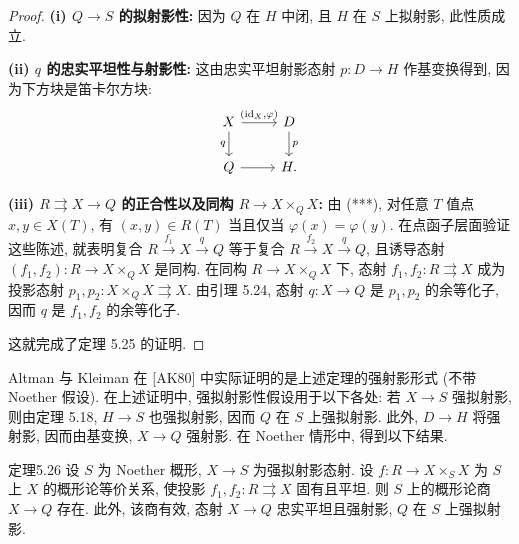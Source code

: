 \begin{proof}
\textbf{(i) $Q\to S$ 的拟射影性:} 因为 $Q$ 在 $H$ 中闭, 且 $H$ 在 $S$ 上拟射影, 此性质成立.

\textbf{(ii) $q$ 的忠实平坦性与射影性:} 这由忠实平坦射影态射 $p:D\to H$ 作基变换得到, 因为下方块是笛卡尔方块:
\[
\begin{tikzcd}
 X\arrow[r,"{(\id_X,\varphi)}"]\arrow[d,"q"']&D\arrow[d,"p"]\\
 Q\arrow[r]&H.
\end{tikzcd}
\]

\textbf{(iii) $R\rightrightarrows X\to Q$ 的正合性以及同构 $R\to X\times_Q X$:}
由 (***), 对任意 $T$ 值点 $x,y\in X(T)$, 有 $(x,y)\in R(T)$ 当且仅当 $\varphi(x)=\varphi(y)$. 在点函子层面验证这些陈述, 就表明复合 $R\xrightarrow{f_1}X\xrightarrow{q}Q$ 等于复合 $R\xrightarrow{f_2}X\xrightarrow{q}Q$, 且诱导态射 $(f_1,f_2):R\to X\times_Q X$ 是同构. 在同构 $R\to X\times_Q X$ 下, 态射 $f_1,f_2:R\rightrightarrows X$ 成为投影态射 $p_1,p_2:X\times_Q X\rightrightarrows X$. 由引理 5.24, 态射 $q:X\to Q$ 是 $p_1,p_2$ 的余等化子, 因而 $q$ 是 $f_1,f_2$ 的余等化子.

这就完成了定理 5.25 的证明.
\end{proof}

Altman 与 Kleiman 在 [AK80] 中实际证明的是上述定理的强射影形式 (不带 Noether 假设). 在上述证明中, 强拟射影性假设用于以下各处: 若 $X\to S$ 强拟射影, 则由定理 5.18, $H\to S$ 也强拟射影, 因而 $Q$ 在 $S$ 上强拟射影. 此外, $D\to H$ 将强射影, 因而由基变换, $X\to Q$ 强射影. 在 Noether 情形中, 得到以下结果.
\begin{origstatement}{定理}{5.26}\label{ch05:thm5.26}
设 $S$ 为 Noether 概形, $X\to S$ 为强拟射影态射. 设 $f:R\to X\times_S X$ 为 $S$ 上 $X$ 的概形论等价关系, 使投影 $f_1,f_2:R\rightrightarrows X$ 固有且平坦. 则 $S$ 上的概形论商 $X\to Q$ 存在. 此外, 该商有效, 态射 $X\to Q$ 忠实平坦且强射影, $Q$ 在 $S$ 上强拟射影.
\end{origstatement}
